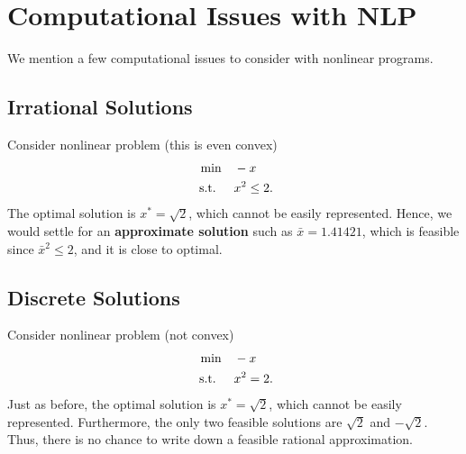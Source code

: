 

\chapter{Computational Issues with NLP}
We mention a few computational issues to consider with nonlinear programs.  
\section{Irrational Solutions}
Consider nonlinear problem (this  is even convex)
\begin{align*}
\min \quad & -x\\
\mbox{ s.t. } \quad  & x^2 \leq 2.
\end{align*}
The optimal solution is $x^* = \sqrt{2}$, which cannot be easily represented.  Hence, we would settle for an \textbf{approximate solution} such as $\bar x = 1.41421$, which is feasible since $\bar x^2 \leq 2$, and it is close to optimal.

\section{Discrete Solutions}
Consider nonlinear problem (not convex)
\begin{align*}
\min \quad & -x\\
\mbox{ s.t. } \quad  & x^2 = 2.
\end{align*}
Just as before, the optimal solution is $x^* = \sqrt{2}$, which cannot be easily represented.  Furthermore, the only two feasible solutions are $\sqrt{2}$ and $-\sqrt{2}$.  Thus, there is no chance to write down a feasible rational approximation.

